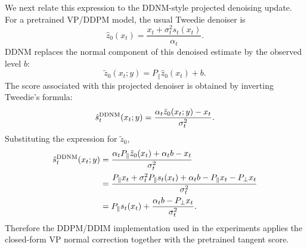 \documentclass[twoside,11pt]{article}
\numberwithin{equation}{section}
\begin{document}
We next relate this expression to the DDNM-style projected denoising update.
For a pretrained VP/DDPM model, the usual Tweedie denoiser is
\[
\hat z_0(x_t)
=
\frac{x_t+\sigma_t^2s_t(x_t)}{\alpha_t}.
\]
DDNM replaces the normal component of this denoised estimate by the observed
level \(b\):
\[
\tilde z_0(x_t;y)
=
P_\parallel \hat z_0(x_t)+b.
\]
The score associated with this projected denoiser is obtained by inverting
Tweedie's formula:
\[
\hat s_t^{\rm DDNM}(x_t;y)
=
\frac{\alpha_t\tilde z_0(x_t;y)-x_t}{\sigma_t^2}.
\]
Substituting the expression for \(\tilde z_0\),
\[
\begin{aligned}
\hat s_t^{\rm DDNM}(x_t;y)
&=
\frac{
\alpha_tP_\parallel\hat z_0(x_t)+\alpha_t b-x_t
}{\sigma_t^2} \\
&=
\frac{
P_\parallel x_t+\sigma_t^2P_\parallel s_t(x_t)
+\alpha_t b
-P_\parallel x_t-P_\perp x_t
}{\sigma_t^2} \\
&=
P_\parallel s_t(x_t)
+
\frac{\alpha_t b-P_\perp x_t}{\sigma_t^2}.
\end{aligned}
\]
Therefore the DDPM/DDIM implementation used in the experiments applies the
closed-form VP normal correction together with the pretrained tangent score.


\end{document}

